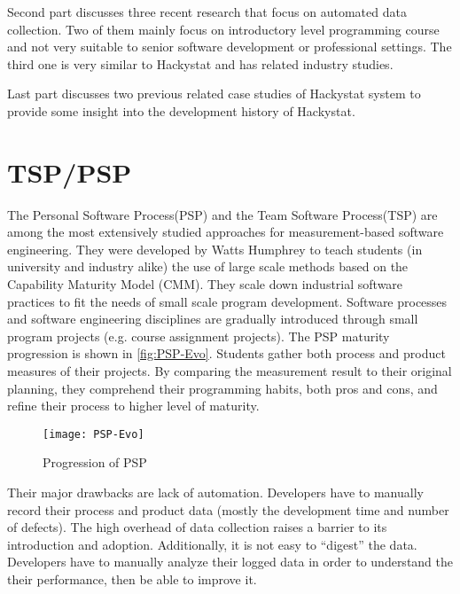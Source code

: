 Second part discusses three recent research that focus on automated data collection. Two of them mainly focus on introductory level programming course and not very suitable to senior software development or professional settings. The third one is very similar to Hackystat and has related industry studies.


Last part discusses two previous related case studies of Hackystat system to provide some insight into the development history of Hackystat.

\section {TSP/PSP}
The Personal Software Process(PSP)\cite{book:psp} and the Team Software Process(TSP)\cite{book:tsp} are among the most extensively studied approaches for measurement-based software engineering. They were developed by Watts Humphrey to teach students (in university and industry alike) the use of large scale methods based on the Capability Maturity Model (CMM). They scale down industrial software practices to fit the needs of small scale program development. Software processes and software engineering disciplines are gradually introduced through small program projects (e.g. course assignment projects). The PSP maturity progression is shown in \autoref{fig:PSP-Evo}. Students gather both process and product measures of their projects. By comparing the measurement result to their original planning, they comprehend their programming habits, both pros and cons, and refine their process to higher level of maturity.

\begin{figure}[htbp] %
   \centering
   \texttt{[image: PSP-Evo]} 
   \caption{Progression of PSP}
   \label{fig:PSP-Evo}
\end{figure}


Their major drawbacks are lack of automation. Developers have to manually record their process and product data (mostly the development time and number of defects). The high overhead of data collection raises a barrier to its introduction and adoption. Additionally, it is not easy to ``digest'' the data. Developers have to manually analyze their logged data in order to understand the their performance, then be able to improve it.


